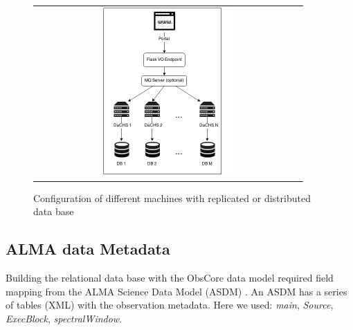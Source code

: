 \documentclass[]{spie}
\begin{document}
\begin{figure}
   \begin{center}
   \begin{tabular}{c}
   \includegraphics[width=0.5\textwidth]{images/interaccion.png}
   \end{tabular}
   \end{center}
   \caption[example]
   { \label{fig:dachs} Configuration of different machines with replicated or distributed data base}
\end{figure}

\subsection{ALMA data Metadata}
Building the relational data base with the ObsCore data model required field mapping from the ALMA Science Data Model (ASDM) \cite{viallefond2009sdm}.  An ASDM has a series of tables (XML) with the observation metadata. Here we used: \emph{main}, \emph{Source}, \emph{ExecBlock}, \emph{spectralWindow}.
\end{document}
